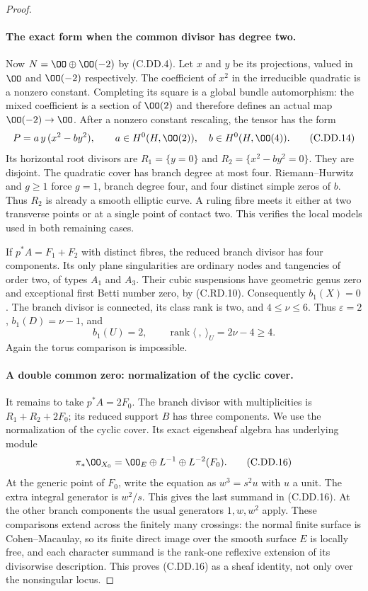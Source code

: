 \begin{proof}
\paragraph{The exact form when the common divisor has degree two.}
Now $N=\OO\oplus\OO(-2)$ by (C.DD.4).
Let $x$ and $y$ be its projections, valued in
$\OO$ and $\OO(-2)$ respectively. The coefficient
of $x^2$ in the irreducible quadratic is a nonzero
constant. Completing its square is a global bundle
automorphism: the mixed coefficient is a section
of $\OO(2)$ and therefore defines an actual map
$\OO(-2)\to\OO$. After a nonzero constant rescaling,
the tensor has the form
\[
 P=a\,y\,(x^2-b y^2),\qquad
 a\in H^0(H,\OO(2)),\quad b\in H^0(H,\OO(4)).
\tag{C.DD.14}
\]
Its horizontal root divisors are
$R_1=\{y=0\}$ and $R_2=\{x^2-b y^2=0\}$.
They are disjoint. The quadratic cover has branch
degree at most four. Riemann--Hurwitz and $g\ge1$
force $g=1$, branch degree four, and four distinct
simple zeros of $b$. Thus $R_2$ is already a smooth
elliptic curve. A ruling fibre meets it either at
two transverse points or at a single point of
contact two. This verifies the local models used
in both remaining cases.

If $p^*A=F_1+F_2$ with distinct fibres, the reduced
branch divisor has four components. Its only plane
singularities are ordinary nodes and tangencies of
order two, of types $A_1$ and $A_3$.
Their cubic suspensions have geometric genus zero
and exceptional first Betti number zero, by
(C.RD.10). Consequently $b_1(X)=0$.
The branch divisor is connected, its class rank
is two, and $4\le\nu\le6$.
Thus $\varepsilon=2$, $b_1(D)=\nu-1$, and
\[
 b_1(U)=2,\qquad
 \operatorname{rank}\langle\ ,\ \rangle_U
                       =2\nu-4\ge4.
\tag{C.DD.15}
\]
Again the torus comparison is impossible.

\paragraph{A double common zero: normalization of the cyclic cover.}
It remains to take $p^*A=2F_0$. The branch divisor
with multiplicities is $R_1+R_2+2F_0$; its reduced
support $B$ has three components. We use the
normalization of the cyclic cover. Its exact
eigensheaf algebra has underlying module
\[
       \pi_*\OO_{X_0}
       =\OO_E\oplus L^{-1}\oplus L^{-2}(F_0).
\tag{C.DD.16}
\]
At the generic point of $F_0$, write the equation
as $w^3=s^2u$ with $u$ a unit. The extra integral
generator is $w^2/s$. This gives the last summand
in (C.DD.16). At the other branch components the
usual generators $1,w,w^2$ apply. These comparisons
extend across the finitely many crossings: the
normal finite surface is Cohen--Macaulay, so its
finite direct image over the smooth surface $E$
is locally free, and each character summand is
the rank-one reflexive extension of its divisorwise
description. This proves (C.DD.16) as a sheaf
identity, not only over the nonsingular locus.


\end{proof}
